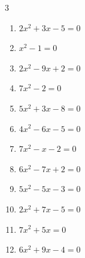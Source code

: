 \begin{multicols}{3}
\begin{enumerate}

  \item $2x^{2}+3x-5=0$


  \item $x^{2}-1=0$

        \phantom{$\displaystyle x=\pm 1$}

  \item $2x^{2}-9x+2=0$


  \item $7x^{2}-2=0$


  \item $5x^{2}+3x-8=0$


\columnbreak %

  \item $4x^{2}-6x-5=0$


  \item $7x^{2}-x-2=0$


  \item $6x^{2}-7x+2=0$


  \item $5x^{2}-5x-3=0$


  \item $2x^{2}+7x-5=0$


  \item $7x^{2}+5x=0$


  \item $6x^{2}+9x-4=0$



\end{enumerate}
\end{multicols}

